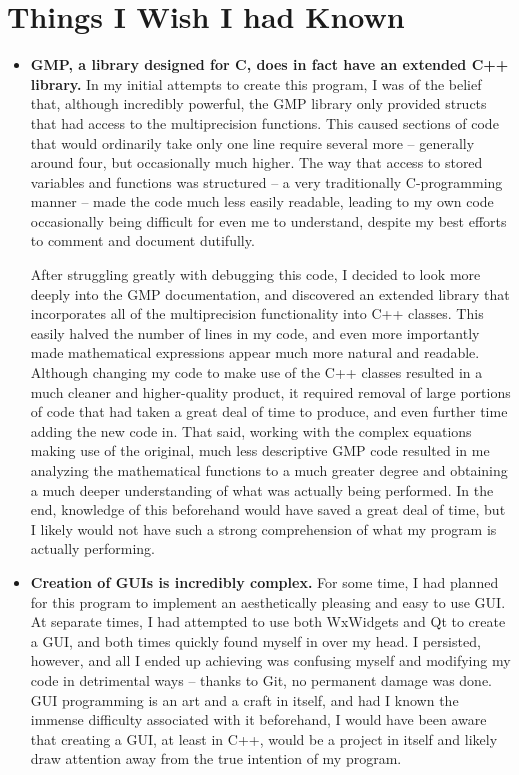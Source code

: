 \documentclass[11pt]{article}
\begin{document}
\begin{itemize}
{}
\end{itemize}


\section{Things I Wish I had Known}
\begin{itemize}
\item
{
\textbf{GMP, a library designed for C, does in fact have an extended C++ library.} In my initial attempts to create this program, I was of the belief that, although incredibly powerful, the GMP library only provided structs that had access to the multiprecision functions. This caused sections of code that would ordinarily take only one line require several more -- generally around four, but occasionally much higher. The way that access to stored variables and functions was structured -- a very traditionally C-programming manner -- made the code much less easily readable, leading to my own code occasionally being difficult for even me to understand, despite my best efforts to comment and document dutifully.

After struggling greatly with debugging this code, I decided to look more deeply into the GMP documentation, and discovered an extended library that incorporates all of the multiprecision functionality into C++ classes. This easily halved the number of lines in my code, and even more importantly made mathematical expressions appear much more natural and readable. Although changing my code to make use of the C++ classes resulted in a much cleaner and higher-quality product, it required removal of large portions of code that had taken a great deal of time to produce, and even further time adding the new code in. That said, working with the complex equations making use of the original, much less descriptive  GMP code resulted in me analyzing the mathematical functions to a much greater degree and obtaining a much deeper understanding of what was actually being performed. In the end, knowledge of this beforehand would have saved a great deal of time, but I likely would not have such a strong comprehension of what my program is actually performing.
}

\item
{
\textbf{Creation of GUIs is incredibly complex.} For some time, I had planned for this program to implement an aesthetically pleasing and easy to use GUI. At separate times, I had attempted to use both WxWidgets and Qt to create a GUI, and both times quickly found myself in over my head. I persisted, however, and all I ended up achieving was confusing myself and modifying my code in detrimental ways -- thanks to Git, no permanent damage was done. GUI programming is an art and a craft in itself, and had I known the immense difficulty associated with it beforehand, I would have been aware that creating a GUI, at least in C++, would be a project in itself and likely draw attention away from the true intention of my program.
}
\end{itemize}
\end{document}
